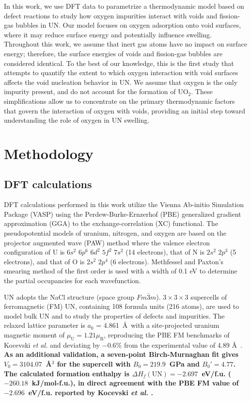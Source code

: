 \documentclass[preprint,12pt,sort&compress]{elsarticle}
\newcommand{\?}{\stackrel{?}{=}}
\providecommand{\DIFaddtex}[1]{{\bf #1}} %
\providecommand{\DIFaddbegin}{\protect\color{blue}} %
\providecommand{\DIFaddend}{\protect\color{black}} %
\providecommand{\DIFadd}[1]{\texorpdfstring{\DIFaddtex{#1}}{#1}} %
\begin{document}
In this work, we use DFT data to parametrize a thermodynamic model based on defect reactions to study how oxygen impurities interact with voids and fission-gas bubbles in UN. Our model focuses on oxygen adsorption onto void surfaces, where it may reduce surface energy and potentially influence swelling. Throughout this work, we assume that inert gas atoms have no impact on surface energy; therefore, the surface energies of voids and fission-gas bubbles are considered identical. To the best of our knowledge, this is the first study that attempts to quantify the extent to which oxygen interaction with void surfaces affects the void nucleation behavior in UN. We assume that oxygen is the only impurity present, and do not account for the formation of UO$_2$. These simplifications allow us to concentrate on the primary thermodynamic factors that govern the interaction of oxygen with voids, providing an initial step toward understanding the role of oxygen in UN swelling.

\section{Methodology}

\subsection{DFT calculations}

DFT calculations performed in this work utilize the Vienna Ab-initio Simulation Package (VASP) \cite{Kresse1993, Kresse1996a, Kresse1996b} using the Perdew-Burke-Ernzerhof (PBE) \cite{Perdew1996} generalized gradient approximation (GGA) to the exchange-correlation (XC) functional. The pseudopotential models of uranium, nitrogen, and oxygen are based on the projector augmented wave (PAW) method \cite{Kresse1999} where the valence electron configuration of U is $6s^2$ $6p^6$ $6d^2$ $5f^2$ $7s^2$ (14 electrons), that of N is $2s^2$ $2p^3$ (5 electrons), and that of O is $2s^2$ $2p^4$ (6 electrons). Methfessel and Paxton’s smearing method \cite{Methfessel1989} of the first order is used with a width of 0.1 eV to determine the partial occupancies for each wavefunction.

UN adopts the NaCl structure (space group $Fm\bar{3}m$). $3 \times 3 \times 3$ supercells of ferromagnetic (FM) UN, containing 108 formula units (216 atoms), are used to model bulk UN and to study the properties of defects and impurities. The relaxed lattice parameter is $a_0$ = 4.861~\AA\ with a site-projected uranium magnetic moment of $\mu_\text{U} = 1.21 \mu_\text{B}$, reproducing the PBE FM benchmarks of Kocevski \textit{et al.} \cite{Kocevski2022I} and deviating by $-0.6$\% from the experimental value of 4.89 \AA\ \cite{Hayes1990I}. \DIFaddbegin \DIFadd{As an additional validation, a seven-point Birch-Murnaghan fit gives $V_0 = 3104.07$~\AA$^3$ for the supercell with $B_0 = 219.9$~GPa and $B_0' = 4.77$. The calculated formation enthalpy is $\Delta H_f(\mathrm{UN}) = -2.697$~eV/f.u. ($-260.18$~kJ/mol-f.u.), in direct agreement with the PBE FM value of $-2.696$~eV/f.u. reported by Kocevski \textit{et al.} \cite{Kocevski2022I}.
}\DIFaddend 
\end{document}
